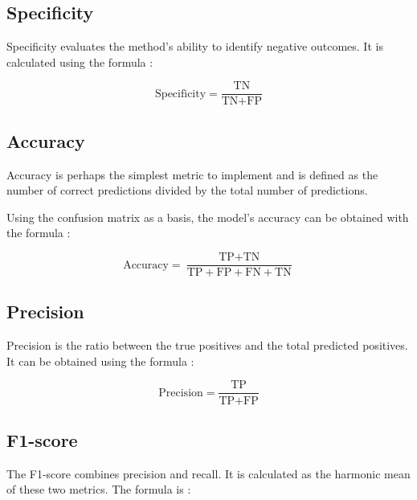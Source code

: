 \subsection{Specificity}

Specificity evaluates the method's ability to identify negative outcomes. It is calculated using the formula \cite{Métricas}:

\begin{center}
\begin{equation}
\text{Specificity} = \dfrac{\text{TN}}{\text{TN} + \text{FP}}
\end{equation}
\end{center}

\subsection{Accuracy}

Accuracy is perhaps the simplest metric to implement and is defined as the number of correct predictions divided by the total number of predictions.

Using the confusion matrix as a basis, the model's accuracy can be obtained with the formula \cite{Métricas}:

\begin{center}
\begin{equation}
\text{Accuracy} = \dfrac{\text{TP} + \text{TN}}{\text{TP} + \text{FP} + \text{FN} + \text{TN}}
\end{equation}
\end{center}

\subsection{Precision}

Precision is the ratio between the true positives and the total predicted positives. It can be obtained using the formula \cite{Métricas}:

\begin{center}
\begin{equation}
\text{Precision} = \dfrac{\text{TP}}{\text{TP} + \text{FP}}
\end{equation}
\end{center}

\subsection{F1-score}

The F1-score combines precision and recall. It is calculated as the harmonic mean of these two metrics. The formula is \cite{Métricas}:

